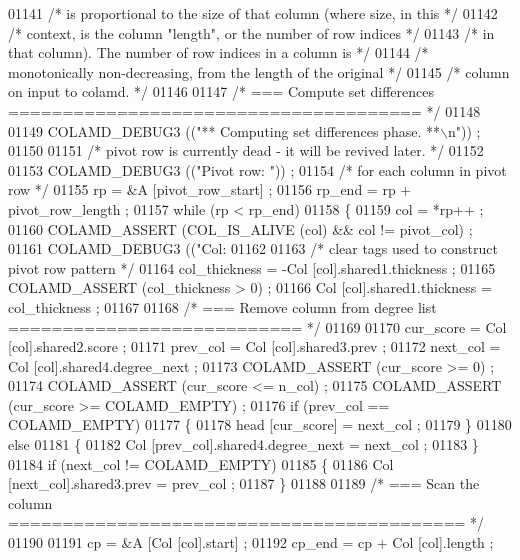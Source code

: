 \begin{DoxyCode}
{{{{{{{{{{{{{{{{{{{{{{01141     \textcolor{comment}{/* is proportional to the size of that column (where size, in this */}
01142     \textcolor{comment}{/* context, is the column "length", or the number of row indices */}
01143     \textcolor{comment}{/* in that column).  The number of row indices in a column is */}
01144     \textcolor{comment}{/* monotonically non-decreasing, from the length of the original */}
01145     \textcolor{comment}{/* column on input to colamd. */}
01146 
01147     \textcolor{comment}{/* === Compute set differences ====================================== */}
01148 
01149     COLAMD\_DEBUG3 ((\textcolor{stringliteral}{"** Computing set differences phase. **\(\backslash\)n"})) ;
01150 
01151     \textcolor{comment}{/* pivot row is currently dead - it will be revived later. */}
01152 
01153     COLAMD\_DEBUG3 ((\textcolor{stringliteral}{"Pivot row: "})) ;
01154     \textcolor{comment}{/* for each column in pivot row */}
01155     rp = &A [pivot\_row\_start] ;
01156     rp\_end = rp + pivot\_row\_length ;
01157     \textcolor{keywordflow}{while} (rp < rp\_end)
01158     \{
01159       col = *rp++ ;
01160       COLAMD\_ASSERT (COL\_IS\_ALIVE (col) && col != pivot\_col) ;
01161       COLAMD\_DEBUG3 ((\textcolor{stringliteral}{"Col: %
01162 
01163       \textcolor{comment}{/* clear tags used to construct pivot row pattern */}
01164       col\_thickness = -Col [col].shared1.thickness ;
01165       COLAMD\_ASSERT (col\_thickness > 0) ;
01166       Col [col].shared1.thickness = col\_thickness ;
01167 
01168       \textcolor{comment}{/* === Remove column from degree list =========================== */}
01169 
01170       cur\_score = Col [col].shared2.score ;
01171       prev\_col = Col [col].shared3.prev ;
01172       next\_col = Col [col].shared4.degree\_next ;
01173       COLAMD\_ASSERT (cur\_score >= 0) ;
01174       COLAMD\_ASSERT (cur\_score <= n\_col) ;
01175       COLAMD\_ASSERT (cur\_score >= COLAMD\_EMPTY) ;
01176       \textcolor{keywordflow}{if} (prev\_col == COLAMD\_EMPTY)
01177       \{
01178     head [cur\_score] = next\_col ;
01179       \}
01180       \textcolor{keywordflow}{else}
01181       \{
01182     Col [prev\_col].shared4.degree\_next = next\_col ;
01183       \}
01184       \textcolor{keywordflow}{if} (next\_col != COLAMD\_EMPTY)
01185       \{
01186     Col [next\_col].shared3.prev = prev\_col ;
01187       \}
01188 
01189       \textcolor{comment}{/* === Scan the column ========================================== */}
01190 
01191       cp = &A [Col [col].start] ;
01192       cp\_end = cp + Col [col].length ;
}}}}}}}}}}}}}}}}}}}}}}}
\end{DoxyCode}

